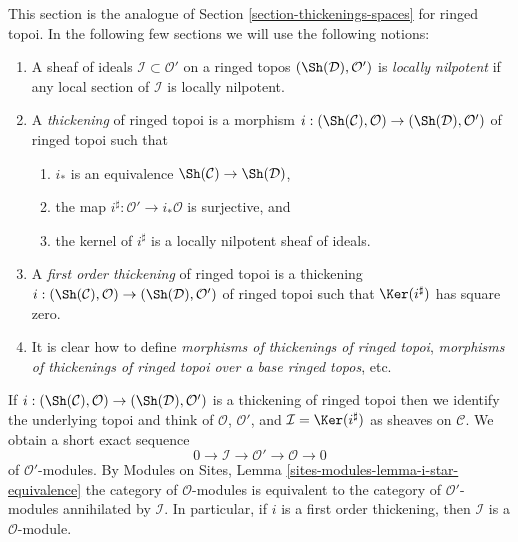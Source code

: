 \noindent
This section is the analogue of Section \ref{section-thickenings-spaces}
for ringed topoi.
In the following few sections we will use the following notions:
\begin{enumerate}
\item A sheaf of ideals $\mathcal{I} \subset \mathcal{O}'$ on
a ringed topos $(\Sh(\mathcal{D}), \mathcal{O}')$ is {\it locally nilpotent}
if any local section of $\mathcal{I}$ is locally nilpotent.
\item A {\it thickening} of ringed topoi is a morphism
$i : (\Sh(\mathcal{C}), \mathcal{O}) \to (\Sh(\mathcal{D}), \mathcal{O}')$
of ringed topoi such that
\begin{enumerate}
\item $i_*$ is an equivalence $\Sh(\mathcal{C}) \to \Sh(\mathcal{D})$,
\item the map $i^\sharp : \mathcal{O}' \to i_*\mathcal{O}$
is surjective, and
\item the kernel of $i^\sharp$ is a locally nilpotent sheaf of ideals.
\end{enumerate}
\item A {\it first order thickening} of ringed topoi is a thickening
$i : (\Sh(\mathcal{C}), \mathcal{O}) \to (\Sh(\mathcal{D}), \mathcal{O}')$
of ringed topoi such that $\Ker(i^\sharp)$ has square zero.
\item It is clear how to define
{\it morphisms of thickenings of ringed topoi},
{\it morphisms of thickenings of ringed topoi over a base ringed topos}, etc.
\end{enumerate}
If
$i : (\Sh(\mathcal{C}), \mathcal{O}) \to (\Sh(\mathcal{D}), \mathcal{O}')$
is a thickening of ringed topoi then we identify the underlying topoi
and think of $\mathcal{O}$, $\mathcal{O}'$, and
$\mathcal{I} = \Ker(i^\sharp)$ as sheaves on $\mathcal{C}$.
We obtain a short exact sequence
$$
0 \to \mathcal{I} \to \mathcal{O}' \to \mathcal{O} \to 0
$$
of $\mathcal{O}'$-modules. By
Modules on Sites, Lemma \ref{sites-modules-lemma-i-star-equivalence}
the category of $\mathcal{O}$-modules is equivalent to the category
of $\mathcal{O}'$-modules annihilated by $\mathcal{I}$. In particular,
if $i$ is a first order thickening, then
$\mathcal{I}$ is a $\mathcal{O}$-module.

